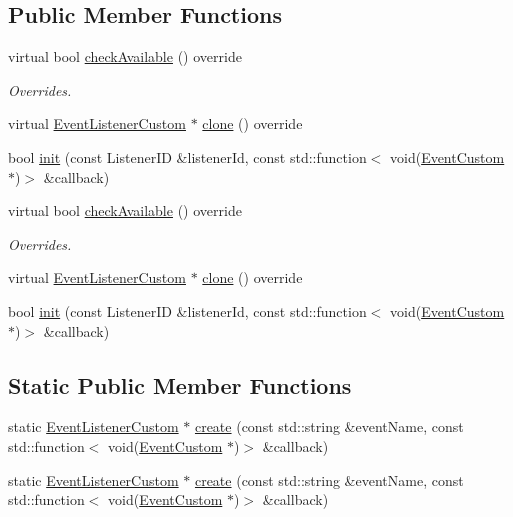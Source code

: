 \subsection*{Public Member Functions}
\begin{DoxyCompactItemize}
\item 
\mbox{\label{classEventListenerCustom_a9be3f3ad1e20340dda29e33fe06de444}} 
virtual bool \hyperlink{classEventListenerCustom_a9be3f3ad1e20340dda29e33fe06de444}{check\+Available} () override
\begin{DoxyCompactList}\small\item\em Overrides. \end{DoxyCompactList}\item 
virtual \hyperlink{classEventListenerCustom}{Event\+Listener\+Custom} $\ast$ \hyperlink{classEventListenerCustom_a9a8bffb7f8169c9ca32aba3bf4cd74bc}{clone} () override
\item 
bool \hyperlink{classEventListenerCustom_ae29940d9da89b7e8f50d4766c638b40f}{init} (const Listener\+ID \&listener\+Id, const std\+::function$<$ void(\hyperlink{classEventCustom}{Event\+Custom} $\ast$)$>$ \&callback)
\item 
\mbox{\label{classEventListenerCustom_a2de79f2f69bd89f68216b5467ed9f50b}} 
virtual bool \hyperlink{classEventListenerCustom_a2de79f2f69bd89f68216b5467ed9f50b}{check\+Available} () override
\begin{DoxyCompactList}\small\item\em Overrides. \end{DoxyCompactList}\item 
virtual \hyperlink{classEventListenerCustom}{Event\+Listener\+Custom} $\ast$ \hyperlink{classEventListenerCustom_a2b1c47443d2288b0b4a5b53fe35914ba}{clone} () override
\item 
bool \hyperlink{classEventListenerCustom_ae29940d9da89b7e8f50d4766c638b40f}{init} (const Listener\+ID \&listener\+Id, const std\+::function$<$ void(\hyperlink{classEventCustom}{Event\+Custom} $\ast$)$>$ \&callback)
\end{DoxyCompactItemize}
\subsection*{Static Public Member Functions}
\begin{DoxyCompactItemize}
\item 
static \hyperlink{classEventListenerCustom}{Event\+Listener\+Custom} $\ast$ \hyperlink{classEventListenerCustom_a9c87b50cc58d3050eea1dd4ae564f430}{create} (const std\+::string \&event\+Name, const std\+::function$<$ void(\hyperlink{classEventCustom}{Event\+Custom} $\ast$)$>$ \&callback)
\item 
static \hyperlink{classEventListenerCustom}{Event\+Listener\+Custom} $\ast$ \hyperlink{classEventListenerCustom_a247e78165db8f43694df2e8871718e3f}{create} (const std\+::string \&event\+Name, const std\+::function$<$ void(\hyperlink{classEventCustom}{Event\+Custom} $\ast$)$>$ \&callback)
\end{DoxyCompactItemize}
